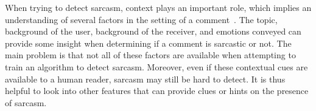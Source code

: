 \documentclass[12pt,a4paper]{report}
\theoremstyle{definition}
\begin{document}
\begin{CJK}{UTF8}{bsmi}
    \par When trying to detect sarcasm, context plays an important role, which implies an understanding of several factors in the setting of a comment~\cite{bamman2015contextualized,joshi2015harnessing}.
    The topic, background of the user, background of the receiver, and emotions conveyed can provide some insight when determining if a comment is sarcastic or not. 
    The main problem is that not all of these factors are available when attempting to train an algorithm to detect sarcasm.
    Moreover, even if these contextual cues are available to a human reader, sarcasm may still be hard to detect.
    It is thus helpful to look into other features that can provide clues or hints on the presence of sarcasm.
    
    

\end{CJK}
\end{document}
